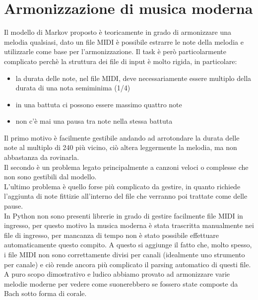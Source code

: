 \section{Armonizzazione di musica moderna}
Il modello di Markov proposto è teoricamente in grado di armonizzare una melodia qualsiasi, dato un file MIDI è possibile estrarre le note della melodia e utilizzarle come base per l'armonizzazione. Il task è però particolarmente complicato perchè la struttura dei file di input è molto rigida, in particolare:
\begin{itemize}
\item la durata delle note, nel file MIDI, deve necessariamente essere multiplo della durata di una nota semiminima (1/4)
\item in una battuta ci possono essere massimo quattro note
\item non c'è mai una pausa tra note nella stessa battuta
\end{itemize} 
Il primo motivo è facilmente gestibile andando ad arrotondare la durata delle note al multiplo di 240 più vicino, ciò altera leggermente la melodia, ma non abbastanza da rovinarla.\\
Il secondo è un problema legato principalmente a canzoni veloci o complesse che non sono gestibili dal modello. \\
L'ultimo problema è quello forse più complicato da gestire, in quanto richiede l'aggiunta di note fittizie all'interno del file che verranno poi trattate come delle pause.\\
In Python non sono presenti librerie in grado di gestire facilmente file MIDI in ingresso, per questo motivo la musica moderna è stata trascritta manualmente nei file di ingresso, per mancanza di tempo non è stato possibile effettuare automaticamente questo compito.
A questo si aggiunge il fatto che, molto spesso, i file MIDI non sono correttamente divisi per canali (idealmente uno strumento per canale) e ciò rende ancora più complicato il parsing automatico di questi file.\\
A puro scopo dimostrativo e ludico abbiamo provato ad armonizzare varie melodie moderne per vedere come suonerebbero se fossero state composte da Bach sotto forma di corale.